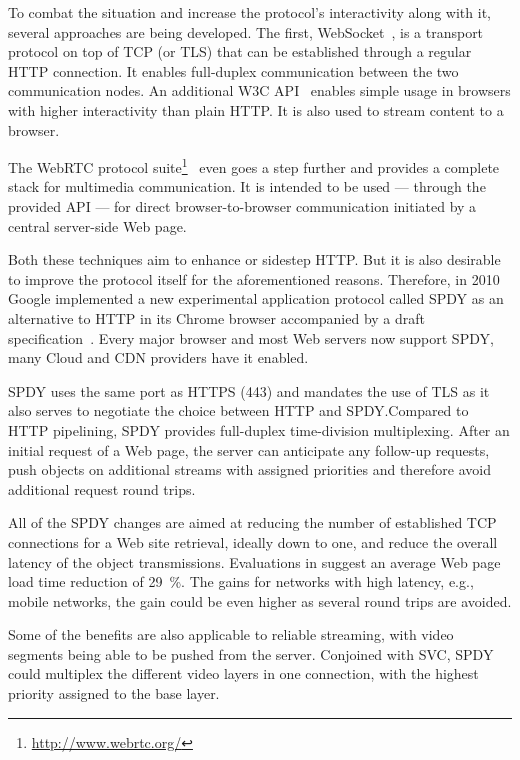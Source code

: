 To combat the situation and increase the protocol's interactivity along with it, several approaches are being developed. The first, WebSocket~\cite{rfc6455}, is a transport protocol on top of \gls{TCP} (or \gls{TLS}) that can be established through a regular \gls{HTTP} connection. It enables full-duplex communication between the two communication nodes. An additional \gls{W3C} \gls{API}~\cite{w3c2011websockets} enables simple usage in browsers with higher interactivity than plain \gls{HTTP}. It is also used to stream content to a browser.

The \acrshort{WebRTC} protocol suite\footnote{\url{http://www.webrtc.org/}}~\cite{webrtcdraft} even goes a step further and provides a complete stack for multimedia communication. It is intended to be used --- through the provided \gls{API} --- for direct browser-to-browser communication initiated by a central server-side Web page.

Both these techniques aim to enhance or sidestep \gls{HTTP}. But it is also desirable to improve the protocol itself for the aforementioned reasons. Therefore, in 2010 Google implemented a new experimental application protocol called SPDY as an alternative to \gls{HTTP} in its Chrome browser accompanied by a draft specification~\cite{google2011SPDYdef, google2010SPDYwp}. Every major browser and most Web servers now support SPDY, many Cloud and \gls{CDN} providers have it enabled.

SPDY uses the same port as \acrshort{HTTPS} (443) and mandates the use of \gls{TLS} as it also serves to negotiate the choice between \gls{HTTP} and SPDY.\@ Compared to \gls{HTTP} pipelining, SPDY provides full-duplex time-division multiplexing. After an initial request of a Web page, the server can anticipate any follow-up requests, push objects on additional streams with assigned priorities and therefore avoid additional request round trips.

All of the SPDY changes are aimed at reducing the number of established \gls{TCP} connections for a Web site retrieval, ideally down to one, and reduce the overall latency of the object transmissions. Evaluations in \cite{google2010SPDYwp} suggest an average Web page load time reduction of \SI{29}{\percent}. The gains for networks with high latency, e.g., mobile networks, the gain could be even higher as several round trips are avoided.

Some of the benefits are also applicable to reliable streaming, with video segments being able to be pushed from the server. Conjoined with \gls{SVC}, SPDY could multiplex the different video layers in one connection, with the highest priority assigned to the base layer.

